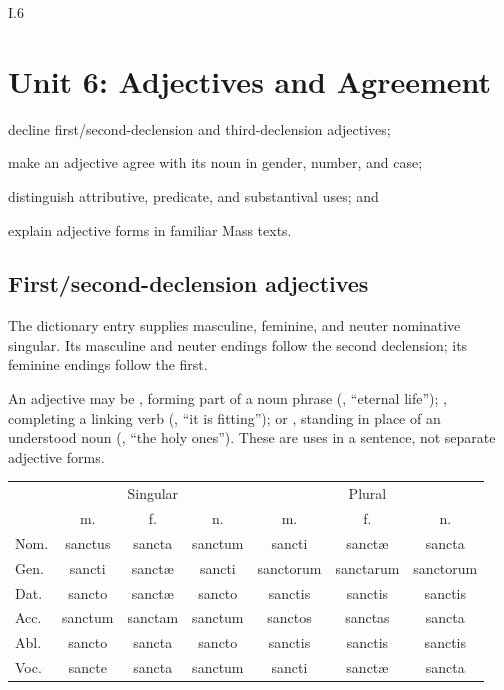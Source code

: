 \begin{courseunit}{I.6}
\chapter{Unit 6: Adjectives and Agreement}

\begin{learningobjectives}
  \item decline first/second-declension and third-declension adjectives;
  \item make an adjective agree with its noun in gender, number, and case;
  \item distinguish attributive, predicate, and substantival uses; and
  \item explain adjective forms in familiar Mass texts.
\end{learningobjectives}

\section{First/second-declension adjectives}

The dictionary entry  supplies masculine, feminine,
and neuter nominative singular. Its masculine and neuter endings follow the
second declension; its feminine endings follow the first.

An adjective may be , forming part of a noun phrase
(, ``eternal life''); , completing a
linking verb (, ``it is fitting''); or ,
standing in place of an understood noun (, ``the holy ones'').
These are uses in a sentence, not separate adjective forms.

\begin{center}\scriptsize
\begin{tabular}{@{}lccc|ccc@{}}
\toprule
& \multicolumn{3}{c}{Singular} & \multicolumn{3}{c}{Plural} \\
& m. & f. & n. & m. & f. & n. \\
\midrule
Nom. & sanctus & sancta & sanctum & sancti & sanctæ & sancta \\
Gen. & sancti & sanctæ & sancti & sanctorum & sanctarum & sanctorum \\
Dat. & sancto & sanctæ & sancto & sanctis & sanctis & sanctis \\
Acc. & sanctum & sanctam & sanctum & sanctos & sanctas & sancta \\
Abl. & sancto & sancta & sancto & sanctis & sanctis & sanctis \\
Voc. & sancte & sancta & sanctum & sancti & sanctæ & sancta \\
\bottomrule
\end{tabular}
\end{center}


\end{courseunit}
